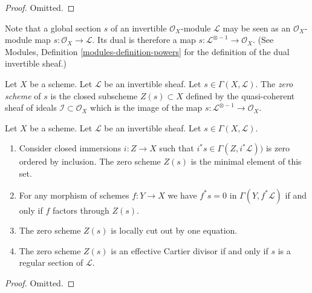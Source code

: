 \begin{proof}
Omitted.
\end{proof}

\noindent
Note that a global section $s$ of an invertible $\mathcal{O}_X$-module
$\mathcal{L}$ may be seen as an $\mathcal{O}_X$-module map
$s : \mathcal{O}_X \to \mathcal{L}$. Its dual is therefore a
map $s : \mathcal{L}^{\otimes -1} \to \mathcal{O}_X$.
(See Modules, Definition \ref{modules-definition-powers}
for the definition of the dual invertible sheaf.)

\begin{definition}
\label{definition-zero-scheme-s}
Let $X$ be a scheme.
Let $\mathcal{L}$ be an invertible sheaf.
Let $s \in \Gamma(X, \mathcal{L})$.
The {\it zero scheme} of $s$ is the closed subscheme $Z(s) \subset X$
defined by the quasi-coherent sheaf of ideals
$\mathcal{I} \subset \mathcal{O}_X$ which is the image of the
map $s : \mathcal{L}^{\otimes -1} \to \mathcal{O}_X$.
\end{definition}

\begin{lemma}
\label{lemma-zero-scheme}
Let $X$ be a scheme.
Let $\mathcal{L}$ be an invertible sheaf.
Let $s \in \Gamma(X, \mathcal{L})$.
\begin{enumerate}
\item Consider closed immersions $i : Z \to X$ such that
$i^*s \in \Gamma(Z, i^*\mathcal{L}))$ is zero
ordered by inclusion. The zero scheme $Z(s)$ is the
minimal element of this set.
\item For any morphism of schemes $f : Y \to X$ we have
$f^*s = 0$ in $\Gamma(Y, f^*\mathcal{L})$ if and only if
$f$ factors through $Z(s)$.
\item The zero scheme $Z(s)$ is locally cut out by one equation.
\item The zero scheme $Z(s)$ is an effective Cartier divisor
if and only if $s$ is a regular section of $\mathcal{L}$.
\end{enumerate}
\end{lemma}

\begin{proof}
Omitted.
\end{proof}

